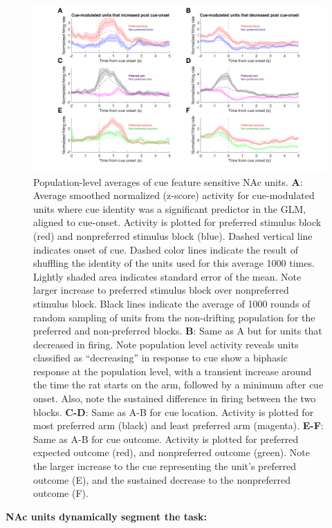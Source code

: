 \documentclass[11pt]{article}
\newcommand{\bsf}[1]{\textbf{#1}}
\begin{document}
{\begin{figure}[h]
\centering
\includegraphics[width=\textwidth]{Fig 7 - Population averages.png}
\caption{Population-level averages of cue feature sensitive NAc units. \bsf{A}:
  Average smoothed normalized (z-score) activity for cue-modulated units where
  cue identity was a significant predictor in the GLM, aligned to
  cue-onset. Activity is plotted for preferred stimulus block (red) and
  nonpreferred stimulus block (blue). Dashed vertical line indicates onset of
  cue. Dashed color lines indicate the result of shuffling the identity of the units used for this average 1000 times. Lightly shaded area indicates standard error of the mean. Note larger
  increase to preferred stimulus block over nonpreferred stimulus block. Black
  lines indicate the average of 1000 rounds of random sampling of units from the
  non-drifting population for the preferred and non-preferred blocks. \bsf{B}:
  Same as A but for units that decreased in firing. Note population level
  activity reveals units classified as “decreasing” in response to cue show a
  biphasic response at the population level, with a transient increase around
  the time the rat starts on the arm, followed by a minimum after cue
  onset. Also, note the sustained difference in firing between the two
  blocks. \bsf{C-D}: Same as A-B for cue location. Activity is plotted for
  most preferred arm (black) and least preferred arm (magenta). \bsf{E-F}: Same as A-B for cue outcome. Activity is
  plotted for preferred expected outcome (red), and nonpreferred outcome
  (green). Note the larger increase to the cue representing the unit’s preferred
  outcome (E), and the sustained decrease to the nonpreferred outcome (F).}
\label{fig:pop}
\end{figure}

{\bf NAc units dynamically segment the task:}

}
\end{document}
